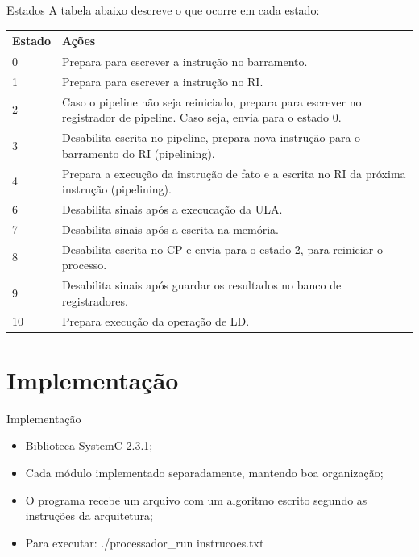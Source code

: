 \documentclass{beamer}
\begin{document}
		\begin{frame}{Estados}
			A tabela abaixo descreve o que ocorre em cada estado:

			\begin{table}[H]
				\footnotesize
				\centering
				\begin{tabular}{l | p{7cm}}
					Estado	& Ações\\
					\hline
					0	& Prepara para escrever a instrução no barramento.\\
					1	& Prepara para escrever a instrução no RI.\\
					2	& Caso o pipeline não seja reiniciado, prepara para escrever no
						  registrador de pipeline. Caso seja, envia para o estado 0.\\
					3	& Desabilita escrita no pipeline, prepara nova instrução para o
						  barramento do RI (pipelining).\\
					4 	& Prepara a execução da instrução de fato e a escrita no RI da 
						  próxima instrução (pipelining).\\
					6	& Desabilita sinais após a execucação da ULA.\\
					7	& Desabilita sinais após a escrita na memória.\\
					8	& Desabilita escrita no CP e envia para o estado 2, para
						  reiniciar o processo.\\
					9	& Desabilita sinais após guardar os resultados no banco de registradores.\\
					10	& Prepara execução da operação de LD.\\
					\hline
				\end{tabular}
			\end{table}
		\end{frame}

	\section{Implementação}
		
	\begin{frame}{Implementação}
		\begin{itemize}
			\item<1-> Biblioteca SystemC 2.3.1;
			\item<2-> Cada módulo implementado separadamente, mantendo boa organização;
			\item<3-> O programa recebe um arquivo com um algoritmo escrito segundo as
				instruções da arquitetura;
			\item<4-> Para executar:
				{\ttfamily ./processador\_run instrucoes.txt}
		\end{itemize}
	\end{frame}
\end{document}
